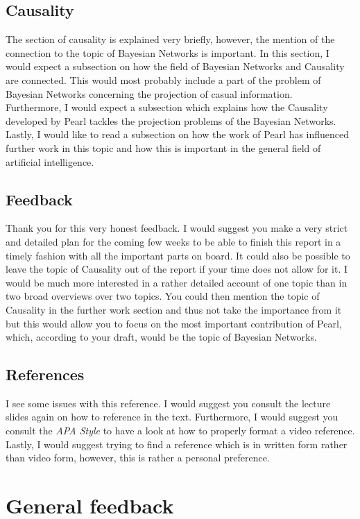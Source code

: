\documentclass{article}
\begin{document}
\subsection{Causality}
The section of causality is explained very briefly, however, the mention of the connection to the topic of Bayesian Networks is important. In this section, I would expect a subsection on how the field of Bayesian Networks and Causality are connected. This would most probably include a part of the problem of Bayesian Networks concerning the projection of casual information.\\
Furthermore, I would expect a subsection which explains how the Causality developed by Pearl tackles the projection problems of the Bayesian Networks. \\
Lastly, I would like to read a subsection on how the work of Pearl has influenced further work in this topic and how this is important in the general field of artificial intelligence.

\subsection{Feedback}
\label{feedback}
Thank you for this very honest feedback. I would suggest you make a very strict and detailed plan for the coming few weeks to be able to finish this report in a timely fashion with all the important parts on board. It could also be possible to leave the topic of Causality out of the report if your time does not allow for it. I would be much more interested in a rather detailed account of one topic than in two broad overviews over two topics. You could then mention the topic of Causality in the further work section and thus not take the importance from it but this would allow you to focus on the most important contribution of Pearl, which, according to your draft, would be the topic of Bayesian Networks.

\subsection{References}
I see some issues with this reference. I would suggest you consult the lecture slides again on how to reference in the text. Furthermore, I would suggest you consult the \textit{APA Style} to have a look at how to properly format a video reference. Lastly, I would suggest trying to find a reference which is in written form rather than video form, however, this is rather a personal preference.

\section{General feedback}
\label{general}
\end{document}

